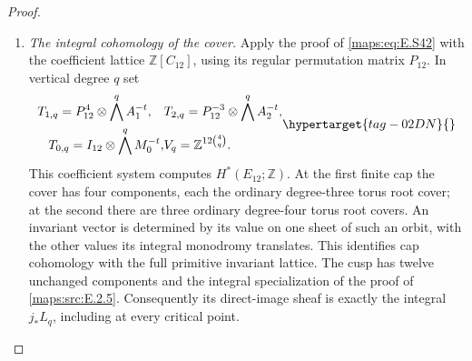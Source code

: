 \documentclass[11pt,a4paper]{article}
\numberwithin{equation}{section}
\theoremstyle{definition}
\begin{document}
\begin{proof}
\begin{enumerate}[label=\arabic*.,leftmargin=*]
\item \emph{The integral cohomology of the cover.}
Apply the proof of \eqref{maps:eq:E.S42} with the coefficient lattice
$\mathbb Z[C_{12}]$, using its regular permutation matrix
$P_{12}$. In vertical degree $q$ set
\begin{equation}
 \begin{aligned}
 T_{1,q}=P_{12}^4\otimes\bigwedge^q A_1^{-t},\quad
 &T_{2,q}=P_{12}^{-3}\otimes\bigwedge^q A_2^{-t},\\
 T_{0,q}=I_{12}\otimes\bigwedge^q M_0^{-t},
 &V_q=\mathbb Z^{12\binom4q}.
 \end{aligned}
 \hypertarget{tag-02DN}{}\label{maps:eq:E.S52}
\end{equation}
This coefficient system computes $H^*(E_{12};\mathbb Z)$.
 At the first finite
cap the cover has four components, each the ordinary
degree-three torus root cover; at the second there are
three ordinary degree-four torus root covers. An invariant
vector is determined by its value on one sheet of such
an orbit, with the other values its integral monodromy
translates. This identifies cap cohomology with the full
primitive invariant lattice. The cusp has twelve unchanged
components and the integral specialization of the proof of \cref{maps:src:E.2.5}.
Consequently its direct-image sheaf is exactly the integral
$j_*L_q$, including at every critical point.


\end{enumerate}
\end{proof}
\end{document}
